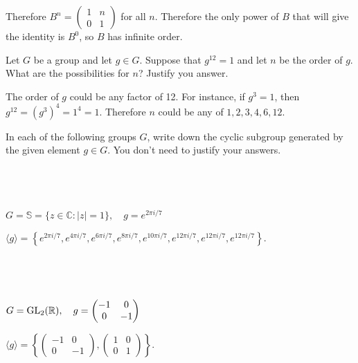 \documentclass[a4paper]{article}
\begin{document}
Therefore $B^n = \begin{pmatrix} 1 & n\\ 0 & 1 \end{pmatrix}$ for all $n$. Therefore the only power of $B$ that will give the identity is $B^0$, so $B$ has infinite order.


\begin{questionbody}
Let $G$ be a group and let $g \in G$. Suppose that $g^{12} = 1$ and let $n$ be the order of $g$. What are the possibilities for $n$? Justify you answer.
\end{questionbody}

The order of $g$ could be any factor of 12. For instance, if $g^3 = 1$, then $g^{12} = \left(g^3\right)^4 = 1^4 = 1$. Therefore $n$ could be any of $1, 2, 3, 4, 6, 12$.


\begin{questionbody}
In each of the following groups $G$, write down the cyclic subgroup generated by the given element $g \in G$. You don't need to justify your answers.
\end{questionbody}

\subsection{~} %

\begin{questionbody}
$G = \mathbb S = \{z \in \mathbb C : |z| = 1\}, \quad g = e^{2 \pi i / 7}$
\end{questionbody}

$\langle g \rangle = \left\{ e^{2 \pi i / 7}, e^{4 \pi i / 7}, e^{6 \pi i / 7}, e^{8 \pi i / 7}, e^{10 \pi i / 7}, e^{12 \pi i / 7}, e^{12 \pi i / 7}, e^{12 \pi i / 7} \right\}$.

\subsection{~} %

\begin{questionbody}
$G = \text{\normalfont GL}_2(\mathbb R), \quad g = \begin{pmatrix} -1 & 0\\ 0 & -1 \end{pmatrix}$
\end{questionbody}

$\langle g \rangle = \left\{ \begin{pmatrix}-1 & 0\\ 0 & -1\end{pmatrix}, \begin{pmatrix}1 & 0\\ 0 & 1\end{pmatrix} \right\}$.
\end{document}
